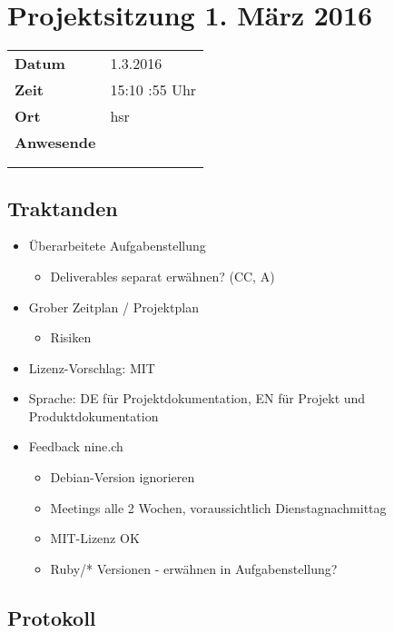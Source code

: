 \documentclass[class=scrbook,crop=false]{standalone}
\begin{document}
	
	\section*{Projektsitzung 1. März 2016}
	
	\begin{tabular}{ll}
		\textbf{Datum} & 1.3.2016 \\
		\textbf{Zeit} & 15:10 \textendash 14:55  Uhr \\
		\textbf{Ort} & \acs{hsr} \\
		\textbf{Anwesende} & \proff \\ & \ubos \\ & \pchr
	\end{tabular}
	
	\subsection*{Traktanden}
	\begin{itemize}
		\item Überarbeitete Aufgabenstellung
		\begin{itemize}
    		\item Deliverables separat erwähnen? (CC, A)
    	\end{itemize}
		\item Grober Zeitplan / Projektplan
		\begin{itemize}
    		\item Risiken
    	\end{itemize}
		\item Lizenz-Vorschlag: MIT
		\item Sprache: DE für Projektdokumentation, EN für Projekt und Produktdokumentation
		\item Feedback nine.ch
		\begin{itemize}
    		\item Debian-Version ignorieren
    		\item Meetings alle 2 Wochen, voraussichtlich Dienstagnachmittag
    		\item MIT-Lizenz OK
    		\item Ruby/* Versionen - erwähnen in Aufgabenstellung?
    	\end{itemize}
	\end{itemize}
	
	\subsection*{Protokoll}
\end{document}
